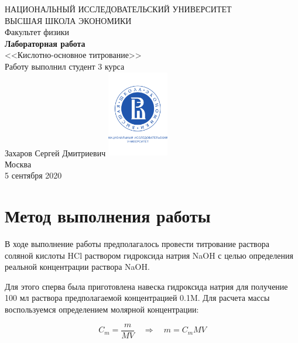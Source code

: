 \documentclass[a4paper, 12pt]{article}
\newcommand{\qrq}
{\ensuremath{\quad \Rightarrow \quad}} %
\begin{document}
	\begin{titlepage}
		\begin{center}
			$$$$
			$$$$
			$$$$
			$$$$
			{\Large{НАЦИОНАЛЬНЫЙ ИССЛЕДОВАТЕЛЬСКИЙ УНИВЕРСИТЕТ}}\\
			\vspace{0.1cm}
			{\Large{ВЫСШАЯ ШКОЛА ЭКОНОМИКИ}}\\
			\vspace{0.25cm}
			{\large{Факультет физики}}\\
			\vspace{5.5cm}
			{\Huge\textbf{{Лабораторная работа}}}\\%
			\vspace{1cm}
			{\LARGE{<<Кислотно-основное титрование>>}}\\%
			\vspace{2cm}
			{Работу выполнил студент 3 курса}\\
			{Захаров Сергей Дмитриевич}
			\vfill
			\includegraphics[width = 0.2\textwidth]{HSElogo}\\
			\vfill
			Москва\\
			5 сентября 2020
		\end{center}
	\end{titlepage}

\tableofcontents

\newpage

\section{Метод выполнения работы}

В ходе выполнение работы предполагалось провести титрование раствора соляной кислоты HCl раствором гидроксида натрия NaOH с целью определения реальной концентрации раствора NaOH.

Для этого сперва была приготовлена навеска гидроксида натрия для получение 100 мл раствора предполагаемой концентрацией 0.1M. Для расчета массы воспользуемся определением молярной концентрации:

\begin{equation}
		C_m = \frac{m}{M V} \qrq m = C_m M V
		\label{eq:NaOH_mass}
\end{equation}
\end{document}
